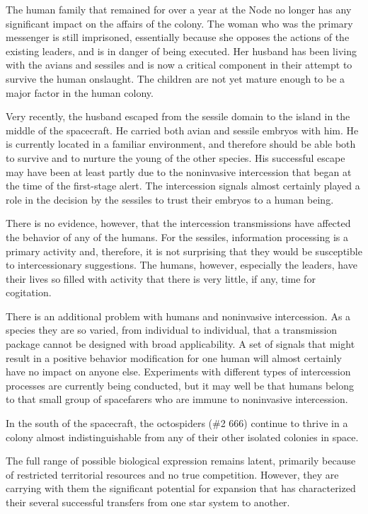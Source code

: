 \documentclass[]{article}
\begin{document}
{{The human family that remained for over a year at the Node no longer has any significant impact on the affairs of the colony.  The woman who was the primary messenger is still imprisoned, essentially because she opposes the actions of the existing leaders, and is in danger of being executed.  Her husband has been living with the avians and sessiles and is now a critical component in their attempt to survive the human onslaught.  The children are not yet mature enough to be a major factor in the human colony.

Very recently, the husband escaped from the sessile domain to the island in the middle of the spacecraft.  He carried both avian and sessile embryos with him.  He is currently located in a familiar environment, and therefore should be able both to survive and to nurture the young of the other species.  His successful escape may have been at least partly due to the noninvasive intercession that began at the time of the first-stage alert.  The intercession signals almost certainly played a role in the decision by the sessiles to trust their embryos to a human being.

There is no evidence, however, that the intercession transmissions have affected the behavior of any of the humans.  For the sessiles, information processing is a primary activity and, therefore, it is not surprising that they would be susceptible to intercessionary suggestions.  The humans, however, especially the leaders, have their lives so filled with activity that there is very little, if any, time for cogitation.

There is an additional problem with humans and noninvasive intercession.  As a species they are so varied, from individual to individual, that a transmission package cannot be designed with broad applicability.  A set of signals that might result in a positive behavior modification for one human will almost certainly have no impact on anyone else.  Experiments with different types of intercession processes are currently being conducted, but it may well be that humans belong to that small group of spacefarers who are immune to noninvasive intercession.

In the south of the spacecraft, the octospiders (\#2 666) continue to thrive in a colony almost indistinguishable from any of their other isolated colonies in space.

The full range of possible biological expression remains latent, primarily because of restricted territorial resources and no true competition.  However, they are carrying with them the significant potential for expansion that has characterized their several successful transfers from one star system to another.

}}
\end{document}
